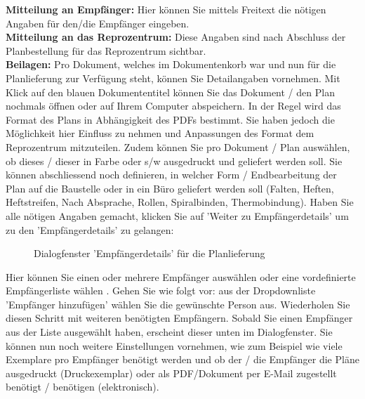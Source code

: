 \textbf{Mitteilung an Empfänger:} Hier können Sie mittels Freitext die nötigen Angaben für den/die Empfänger eingeben. \\
\textbf{Mitteilung an das Reprozentrum:} Diese Angaben sind nach Abschluss der Planbestellung für das Reprozentrum sichtbar. \\
\textbf{Beilagen:} Pro Dokument, welches im Dokumentenkorb war und nun für die Planlieferung zur Verfügung steht, können Sie Detailangaben vornehmen.   Mit Klick auf den blauen Dokumententitel können Sie das Dokument / den Plan nochmals öffnen oder auf Ihrem Computer abspeichern.
In der Regel wird das Format des Plans in Abhängigkeit des PDFs bestimmt. Sie haben jedoch die Möglichkeit hier Einfluss zu nehmen und Anpassungen des Format dem Reprozentrum mitzuteilen. Zudem können Sie pro Dokument / Plan auswählen, ob dieses / dieser in Farbe oder s/w ausgedruckt und geliefert werden soll. Sie können abschliessend noch definieren, in welcher Form / Endbearbeitung der Plan auf die Baustelle oder in ein Büro geliefert werden soll (Falten, Heften, Heftstreifen, Nach Absprache, Rollen, Spiralbinden, Thermobindung). Haben Sie alle nötigen Angaben gemacht, klicken Sie auf 'Weiter zu Empfängerdetails' um zu den 'Empfängerdetails' zu gelangen:

\begin{figure}[H]
\caption{Dialogfenster 'Empfängerdetails' für die Planlieferung}
\end{figure}

Hier können Sie einen oder mehrere Empfänger auswählen  oder eine vordefinierte Empfängerliste wählen . Gehen Sie wie folgt vor: aus der Dropdownliste 'Empfänger hinzufügen' wählen Sie die gewünschte Person aus. Wiederholen Sie diesen Schritt mit weiteren benötigten Empfängern. Sobald Sie einen Empfänger aus der Liste ausgewählt haben, erscheint dieser unten im Dialogfenster. Sie können nun noch weitere Einstellungen vornehmen, wie zum Beispiel wie viele Exemplare pro Empfänger benötigt werden und ob der / die Empfänger die Pläne ausgedruckt (Druckexemplar) oder als PDF/Dokument per E-Mail zugestellt benötigt / benötigen (elektronisch). \\

